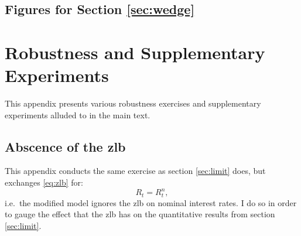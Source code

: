 \documentclass[12pt]{article} %
\numberwithin{equation}{section} %
\numberwithin{figure}{section}
\numberwithin{table}{section}
\begin{document}
\begin{refsection}
\begin{appendices}
\subsection{Figures for Section \ref{sec:wedge}}
\label{sec-app:figures-wedge}

\thispagestyle{plain}
\section{Robustness and Supplementary Experiments}
\label{sec-app:robust}

This appendix presents various robustness exercises and supplementary experiments alluded to in the main text.

\subsection{Abscence of the \Gls{zlb}}
\label{sec-app:robust-no-zlb}

This appendix conducts the same exercise as section \ref{sec:limit} does, but exchanges \eqref{eq:zlb} for:
\begin{equation}
    R_t = R^n_t, \label{eq:no-zlb}
\end{equation}
i.e.~the modified model ignores the \Gls{zlb} on nominal interest rates. I do so in order to gauge the effect that the \Gls{zlb} has on the quantitative results from section \ref{sec:limit}.




\end{appendices}
\end{refsection}
\end{document}

